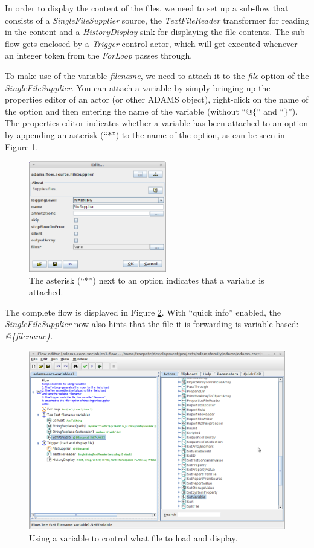 In order to display the content of the files, we need to set up a sub-flow that
consists of a \textit{SingleFileSupplier} source, the \textit{TextFileReader}
transformer for reading in the content and a \textit{HistoryDisplay} sink for
displaying the file contents. The sub-flow gets enclosed by a \textit{Trigger}
control actor, which will get executed whenever an integer token from the
\textit{ForLoop} passes through.

To make use of the variable \textit{filename}, we need to attach it to the
\textit{file} option of the \textit{SingleFileSupplier}. You can attach a
variable by simply bringing up the properties editor of an actor (or other
ADAMS object), right-click on the name of the option and then entering the name
of the variable (without ``$@\{$'' and ``$\}$''). The properties editor
indicates whether a variable has been attached to an option by appending an asterisk
(``$*$'') to the name of the option, as can be seen in Figure
\ref{floweditor-variables1_flow-detail}.
\begin{figure}[htb]
  \centering
  \includegraphics[width=6.0cm]{images/floweditor-variables1_flow-detail.png}
  \caption{The asterisk (``$*$'') next to an option indicates that a variable is
  attached.}
  \label{floweditor-variables1_flow-detail}
\end{figure}

The complete flow is displayed in Figure \ref{floweditor-variables1_flow}. With
``quick info'' enabled, the \textit{SingleFileSupplier} now also hints that the
file it is forwarding is variable-based: \textit{@\{filename\}}.
\begin{figure}[htb]
  \centering
  \includegraphics[width=12.0cm]{images/floweditor-variables1_flow.png}
  \caption{Using a variable to control what file to load and display.}
  \label{floweditor-variables1_flow}
\end{figure}


